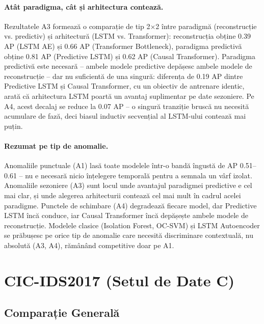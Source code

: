 \paragraph{Atât paradigma, cât și arhitectura contează.} Rezultatele A3 formează o comparație de tip 2$\times$2 între paradigmă (reconstrucție vs. predictiv) și arhitectură (LSTM vs. Transformer): reconstrucția obține 0.39 AP (LSTM AE) și 0.66 AP (Transformer Bottleneck), paradigma predictivă obține 0.81 AP (Predictive LSTM) și 0.62 AP (Causal Transformer).
Paradigma predictivă este necesară -- ambele modele predictive depășesc ambele modele de reconstrucție -- dar nu suficientă de una singură: diferența de 0.19 AP dintre Predictive LSTM și Causal Transformer, cu un obiectiv de antrenare identic, arată că arhitectura LSTM poartă un avantaj suplimentar pe date sezoniere. Pe A4, acest decalaj se reduce la 0.07 AP -- o singură tranziție bruscă nu necesită acumulare de fază, deci biasul inductiv secvențial al LSTM-ului contează mai puțin.

\paragraph{Rezumat pe tip de anomalie.} Anomaliile punctuale (A1) lasă toate modelele într-o bandă îngustă de AP 0.51--0.61 -- nu e necesară nicio înțelegere temporală pentru a semnala un vârf izolat.
Anomaliile sezoniere (A3) sunt locul unde avantajul paradigmei predictive e cel mai clar, și unde alegerea arhitecturii contează cel mai mult în cadrul acelei paradigme. Punctele de schimbare (A4) degradează fiecare model, dar Predictive LSTM încă conduce, iar Causal Transformer încă depășește ambele modele de reconstrucție. Modelele clasice (Isolation Forest, OC-SVM) și LSTM Autoencoder se prăbușesc pe orice tip de anomalie care necesită discriminare contextuală, nu absolută (A3, A4), rămânând competitive doar pe A1.



\section{CIC-IDS2017 (Setul de Date C)}

\subsection{Comparație Generală}

